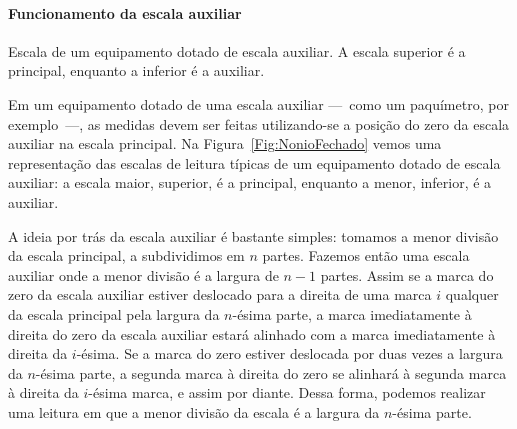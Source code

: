 \paragraph{Funcionamento da escala auxiliar}

\begin{marginfigure}[2 cm]
\centering
{}
\caption{Escala de um equipamento dotado de escala auxiliar. A escala superior é a principal, enquanto a inferior é a auxiliar.\label{Fig:NonioFechado}}
\end{marginfigure}


Em um equipamento dotado de uma escala auxiliar ---~como um paquímetro, por exemplo~---, as medidas devem ser feitas utilizando-se a posição do zero da escala auxiliar na escala principal. Na Figura~\eqref{Fig:NonioFechado} vemos uma representação das escalas de leitura típicas de um equipamento dotado de escala auxiliar: a escala maior, superior, é a principal, enquanto a menor, inferior, é a auxiliar.

A ideia por trás da escala auxiliar é bastante simples: tomamos a menor divisão da escala principal, a subdividimos em $n$ partes. Fazemos então uma escala auxiliar onde a menor divisão é a largura de $n-1$ partes. Assim se a marca do zero da escala auxiliar estiver deslocado para a direita de uma marca $i$ qualquer da escala principal pela largura da $n$-ésima parte, a marca imediatamente à direita do zero da escala auxiliar estará alinhado com a marca imediatamente à direita da $i$-ésima. Se a marca do zero estiver deslocada por duas vezes a largura da $n$-ésima parte, a segunda marca à direita do zero se alinhará à segunda marca à direita da $i$-ésima marca, e assim por diante. Dessa forma, podemos realizar uma leitura em que a menor divisão da escala é a largura da $n$-ésima parte.

